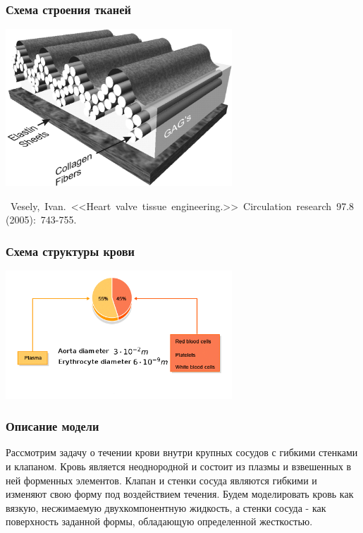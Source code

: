 \documentclass[14pt]{beamer}
\begin{document}
\begin{frame}
\frametitle{Схема строения тканей}
    \begin{center}
        \includegraphics[width=8.5cm]{valve_tissue_structure.jpg}
    \end{center}

    \begin{spacing}{0.5}
        \mbox{\scriptsize
            Vesely, Ivan. <<Heart valve tissue engineering.>> Circulation research 97.8 (2005): 743-755.
        }
    \end{spacing}

\end{frame}

\begin{frame}
\frametitle{Схема структуры крови}
    \begin{center}
        \includegraphics[width=8.5cm]{blood_scheme3.png}
    \end{center}
\end{frame}

\begin{frame}
\frametitle{Описание модели}
Рассмотрим задачу о течении крови внутри крупных сосудов с гибкими стенками и клапаном. Кровь является неоднородной и состоит из плазмы и взвешенных в ней форменных элементов. Клапан и стенки сосуда являются гибкими и изменяют свою форму под воздействием течения. Будем моделировать кровь как вязкую, несжимаемую двухкомпонентную жидкость, а стенки сосуда - как поверхность заданной формы, обладающую определенной жесткостью.
\end{frame}
\end{document}
